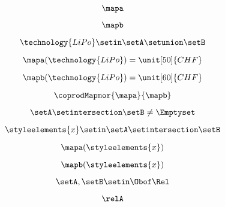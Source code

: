 \begin{forslides}
    \begin{equation}
        \label{eq:systems-109}
        \mapa
    \end{equation}

    \begin{equation}
        \label{eq:systems-110}
        \mapb
    \end{equation}

    \begin{equation}
        \label{eq:systems-111}
        \technology{LiPo}\setin \setA\setunion \setB
    \end{equation}

    \begin{equation}
        \label{eq:systems-112}
        \mapa(\technology{LiPo})=\unit[50]{CHF}
    \end{equation}

    \begin{equation}
        \label{eq:systems-113}
        \mapb(\technology{LiPo})=\unit[60]{CHF}
    \end{equation}

    \begin{equation}
        \label{eq:systems-114}
        \coprodMapmor{\mapa}{\mapb}
    \end{equation}

    \begin{equation}
        \label{eq:systems-115}
        \setA\setintersection \setB\neq \Emptyset
    \end{equation}

    \begin{equation}
        \label{eq:systems-116}
        \styleelements{x}\setin \setA\setintersection \setB
    \end{equation}

    \begin{equation}
        \label{eq:systems-117}
        \mapa(\styleelements{x})
    \end{equation}

    \begin{equation}
        \label{eq:systems-118}
        \mapb(\styleelements{x})
    \end{equation}

    \begin{equation}
        \label{eq:systems-119}
        \setA,\setB\setin \Obof\Rel
    \end{equation}

    \begin{equation}
        \label{eq:systems-120}
        \relA
    \end{equation}


\end{forslides}
